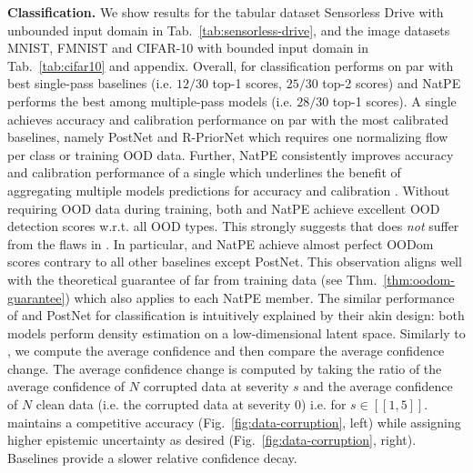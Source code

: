 \textbf{Classification.} We show results for the tabular dataset Sensorless Drive with unbounded input domain in Tab.~\ref{tab:sensorless-drive}, and the image datasets MNIST, FMNIST and CIFAR-10 with bounded input domain in Tab.~\ref{tab:cifar10} and appendix. Overall, for classification \NatPNacro{} performs on par with best single-pass baselines (i.e. $12/30$ top-1 scores, $25/30$ top-2 scores) and NatPE performs the best among multiple-pass models (i.e. $28/30$ top-1 scores). A single \NatPNacro{} achieves accuracy and calibration performance on par with the most calibrated baselines, namely PostNet and R-PriorNet which requires one normalizing flow per class or training OOD data. Further, NatPE consistently improves accuracy and calibration performance of a single \NatPNacro{} which underlines the benefit of aggregating multiple models predictions for accuracy and calibration \citep{ensembles}. Without requiring OOD data during training, both \NatPNacro{} and NatPE achieve excellent OOD detection scores w.r.t. all OOD types. This strongly suggests that \NatPNacro{} does \emph{not} suffer from the flaws in \cite{anomaly-detection,deep-generative,typicality_OOD_generative}. In particular, \NatPNacro{} and NatPE achieve almost perfect OODom scores contrary to all other baselines except PostNet. This observation aligns well with the theoretical guarantee of \NatPNacro{} far from training data (see Thm.~\ref{thm:oodom-guarantee}) which also applies to each NatPE member. The similar performance of \NatPNacro{} and PostNet for classification is intuitively explained by their akin design: both models perform density estimation on a low-dimensional latent space. Similarly to \cite{postnet}, we compute the average confidence  and then compare the average confidence change. The average confidence change is computed by taking the ratio of the average confidence of $N$ corrupted data at severity $s$ and the average confidence of $N$ clean data (i.e. the corrupted data at severity $0$) i.e.  for $s \in [\![ 1, 5 ]\!]$. \NatPNacro{} maintains a competitive accuracy (Fig.~\ref{fig:data-corruption}, left) while assigning higher epistemic uncertainty as desired (Fig.~\ref{fig:data-corruption}, right). Baselines provide a slower relative confidence decay.

